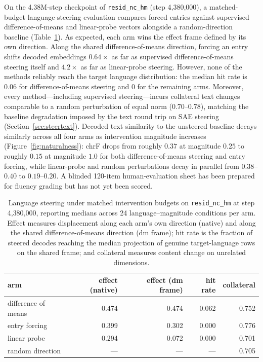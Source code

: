 On the 4.38M-step checkpoint of \texttt{resid\_nc\_hm} (step
4{,}380{,}000), a matched-budget language-steering evaluation compares
forced entries against supervised difference-of-means and linear-probe
vectors alongside a random-direction baseline
(Table~\ref{tab:steer-overlay}). As expected, each arm wins the effect
frame defined by its own direction.
Along the shared difference-of-means direction, forcing an entry shifts
decoded embeddings $0.64\times$ as far as supervised difference-of-means
steering itself and $4.2\times$ as far as linear-probe steering. However,
none of the methods reliably reach the target language distribution: the
median hit rate is $0.06$ for difference-of-means steering and $0$ for
the remaining arms. Moreover, every method---including supervised
steering---incurs collateral text changes comparable to a random
perturbation of equal norm ($0.70$--$0.78$), matching the baseline
degradation imposed by the text round trip on SAE steering
(Section~\ref{sec:steertext}). Decoded text similarity to the unsteered
baseline decays similarly across all four arms as intervention magnitude
increases (Figure~\ref{fig:naturalness}): chrF drops from roughly $0.37$
at magnitude $0.25$ to roughly $0.15$ at magnitude $1.0$ for both
difference-of-means steering and entry forcing, while linear-probe and
random perturbations decay in parallel from $0.38$--$0.40$ to
$0.19$--$0.20$. A blinded 120-item human-evaluation sheet has been
prepared for fluency grading but has not yet been scored.

\begin{table}[htbp]\centering\small
\begin{tabular}{@{}lrrrr@{}}
\toprule
arm & effect (native) & effect (dm frame) & hit rate & collateral \\
\midrule
difference of means    & 0.474 & 0.474 & 0.062 & 0.752 \\
entry forcing          & 0.399 & 0.302 & 0.000 & 0.776 \\
linear probe           & 0.294 & 0.072 & 0.000 & 0.701 \\
random direction       & ---   & ---   & ---   & 0.705 \\
\bottomrule
\end{tabular}
\caption{Language steering under matched intervention budgets on
\texttt{resid\_nc\_hm} at step 4{,}380{,}000, reporting medians across 24
language--magnitude conditions per arm. Effect measures displacement along
each arm's own direction (native) and along the shared difference-of-means
direction (dm frame); hit rate is the fraction of steered decodes reaching
the median projection of genuine target-language rows on the shared frame;
and collateral measures content change on unrelated dimensions.}
\label{tab:steer-overlay}
\end{table}


